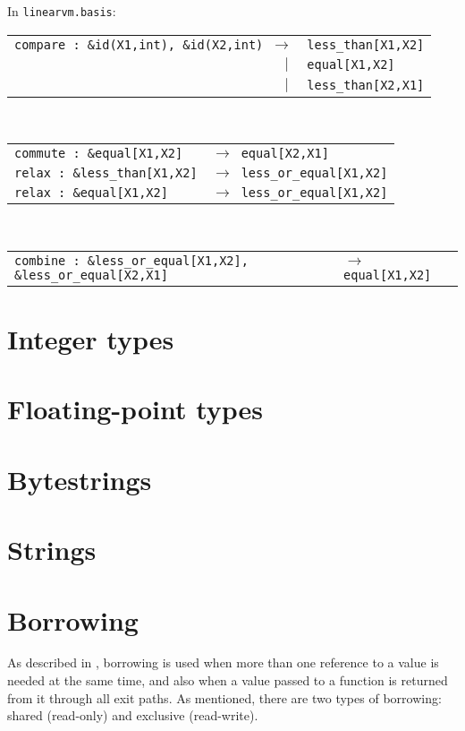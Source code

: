 \documentclass[a4paper]{book}
\begin{document}
In \texttt{linearvm.basis}:\\
\begin{tabular}{r@{}l}
\texttt{compare : \&id(X1,int), \&id(X2,int) $\to$}
& \texttt{less\_than[X1,X2]}\\
$|\;$ & \texttt{equal[X1,X2]}\\
$|\;$ & \texttt{less\_than[X2,X1]}\\
\end{tabular}
\\
\begin{tabular}{l@{}l}
\texttt{commute : \&equal[X1,X2]} & \texttt{$\to$ equal[X2,X1]}\\
\texttt{relax : \&less\_than[X1,X2]} & \texttt{$\to$ less\_or\_equal[X1,X2]}\\
\texttt{relax : \&equal[X1,X2]} & \texttt{$\to$ less\_or\_equal[X1,X2]}\\
\end{tabular}
\\
\begin{tabular}{l@{}l}
\texttt{combine : \&less\_or\_equal[X1,X2], \&less\_or\_equal[X2,X1]}
& \texttt{$\to$ equal[X1,X2]}\\
\end{tabular}

\chapter{Integer types}
\chapter{Floating-point types}
\chapter{Bytestrings}





\chapter{Strings}
\chapter{Borrowing}
As described in , borrowing is used when
more than one reference to a value is needed at the same time, and also
when a value passed to a function is returned from it through all exit paths.
As mentioned, there are two types of borrowing: shared (read-only) and
exclusive (read-write).
\end{document}
